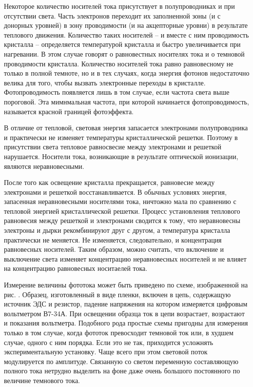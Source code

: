 \documentclass[a4paper,12pt]{article} %
\begin{document}
	Некоторое количество носителей тока присутствует в полупроводниках и при отсутствии света. Часть электронов переходит их заполненной зоны (и с донорных уровней) в зону проводимости (и на акцепторные уровни) в результате теплового движения. Количество таких носителей -- и вместе с ним проводимость кристалла -- определяется температурой кристалла и быстро увеличивается при нагревании. В этом случае говорят о равновестных носителях тока и о темновой проводимости кристалла. Количество носителей тока равно равновесному не только в полной темноте, но и в тех случаях, когда энергия фотонов недостаточно велика для того, чтобы вызвать электронные переходы в кристалле. Фотопроводимость появляется лишь в том случае, если частота света выше пороговой. Эта мимнмальная частота, при которой начинается фотопроводимость, называется красной границей фотоэффекта.
	
	В отличие от тепловой, световая энергия запасается электронами полупроводника и практически не изменяет температуры кристаллической решетки. Поэтому в присутствии света тепловое равносвесие между электронами и решеткой нарушается. Носители тока, возникающие в результате оптической ионизации, являются неравновесными.

	После того как освещение кристалла прекращается, равновесие между электронами и решеткой восстанавливается. В обычных условиях энергия, запасенная неравновесными носителями тока, ничтожно мала по сравнению с тепловой энергией кристаллической решетки. Процесс установления теплового равновесия между решеткой и электронами сводится к тому, что неравновесны электроны и дырки рекомбинируют друг с другом, а температура кристалла практически не меняется. Не изменяется, следовательно, и концентрация равновесных носителей. Таким образом, можно считать, что включение и выключение света изменяет концентрацию неравновесных носителей и не влияет на концентрацию равновесных носитаелей тока.

	Измерение величины фототока может быть приведено по схеме, изображенной на рис. . Образец, изготовленный в виде пленки, включен в цепь, содержащую источник ЭДС и резистор, падение напряжения на котором измеряется цифровым вольтметром В7-34А. При освещении образца ток в цепи возрастает, возрастают и показания вольтметра. Подобного рода простые схемы пригодны для измерения только в том случае, когда фототок превосходит темновой ток или, в худшем случае, одного с ним порядка. Если это не так, приходится усложнять экспериментальную установку. Чаще всего при этом световой поток модулируется по амплитуде. Связанную со светом переменную составляющую полного тока нетрудно выделить на фоне даже очень большого постоянного по величине темнового тока.
\end{document}
